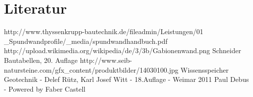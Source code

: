 \documentclass[11pt,fleqn,a4paper,halfparskip]{article}
\begin{document}
\section{Literatur}
\begin{thebibliography}{9}
http://www.thyssenkrupp-bautechnik.de/fileadmin/Leistungen/01 \_Spundwandprofile/\_media/spundwandhandbuch.pdf
 http://upload.wikimedia.org/wikipedia/de/3/3b/Gabionenwand.png
 Schneider Bautabellen, 20. Auflage
 http://www.seib-natursteine.com/gfx\_content/produktbilder/14030100.jpg
 Wissensspeicher Geotechnik - Delef Rütz, Karl Josef Witt - 18.Auflage - Weimar 2011
 Paul Debus - Powered by Faber Castell
\end{thebibliography}
\end{document}
